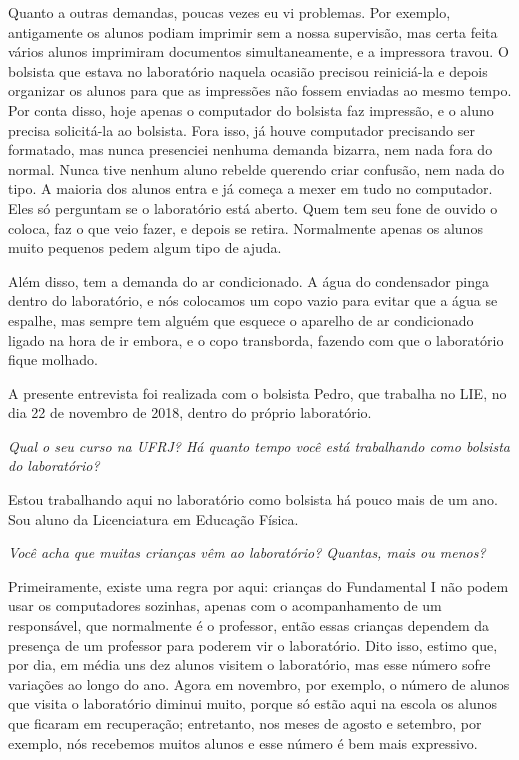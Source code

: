Quanto a outras demandas, poucas vezes eu vi problemas. Por exemplo, antigamente os alunos podiam imprimir sem a nossa supervisão, mas certa feita vários alunos imprimiram documentos simultaneamente, e a impressora travou. O bolsista que estava no laboratório naquela ocasião precisou reiniciá-la e depois organizar os alunos para que as impressões não fossem enviadas ao mesmo tempo. Por conta disso, hoje apenas o computador do bolsista faz impressão, e o aluno precisa solicitá-la ao bolsista. Fora isso, já houve computador precisando ser formatado, mas nunca presenciei nenhuma demanda bizarra, nem nada fora do normal. Nunca tive nenhum aluno rebelde querendo criar confusão, nem nada do tipo. A maioria dos alunos entra e já começa a mexer em tudo no computador. Eles só perguntam se o laboratório está aberto. Quem tem seu fone de ouvido o coloca, faz o que veio fazer, e depois se retira. Normalmente apenas os alunos muito pequenos pedem algum tipo de ajuda.

Além disso, tem a demanda do ar condicionado. A água do condensador pinga dentro do laboratório, e nós colocamos um copo vazio para evitar que a água se espalhe, mas sempre tem alguém que esquece o aparelho de ar condicionado ligado na hora de ir embora, e o copo transborda, fazendo com que o laboratório fique molhado.

\label{anx:LABEL_ANX_E}

A presente entrevista foi realizada com o bolsista Pedro, que trabalha no LIE, no dia 22 de novembro de 2018, dentro do próprio laboratório.

\textit{Qual o seu curso na UFRJ? Há quanto tempo você está trabalhando como bolsista do laboratório?}

Estou trabalhando aqui no laboratório como bolsista há pouco mais de um ano. Sou aluno da Licenciatura em Educação Física.

\textit{Você acha que muitas crianças vêm ao laboratório? Quantas, mais ou menos?}

Primeiramente, existe uma regra por aqui: crianças do Fundamental I não podem usar os computadores sozinhas, apenas com o acompanhamento de um responsável, que normalmente é o professor, então essas crianças dependem da presença de um professor para poderem vir o laboratório. Dito isso, estimo que, por dia, em média uns dez alunos visitem o laboratório, mas esse número sofre variações ao longo do ano. Agora em novembro, por exemplo, o número de alunos que visita o laboratório diminui muito, porque só estão aqui na escola os alunos que ficaram em recuperação; entretanto, nos meses de agosto e setembro, por exemplo, nós recebemos muitos alunos e esse número é bem mais expressivo.

